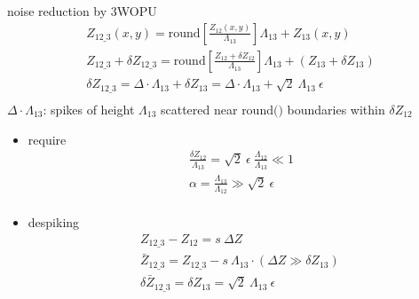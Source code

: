 \documentclass[t, aspectratio=169]{beamer}
\begin{document}
\begin{frame}[allowframebreaks]{noise reduction by 3WOPU}
	\begin{gather*}
Z_{12\_3}(x,y) = \textrm{round}\left[\frac{Z_{12}(x,y)}{\Lambda_{13}}\right] \Lambda_{13} + Z_{13}(x,y) \\
Z_{12\_3} + \delta Z_{12\_3} = \textrm{round}\left[\frac{Z_{12} + \delta Z_{12}}{\Lambda_{13}} \right] \Lambda_{13} + (Z_{13} + \delta Z_{13}) \\
\delta Z_{12\_3} = \Delta\cdot \Lambda_{13} + \delta Z_{13} = \Delta\cdot\Lambda_{13} + \sqrt{2}\ \Lambda_{13}\ \epsilon \\
	\end{gather*}
$\Delta\cdot\Lambda_{13}$: 		spikes of height $\Lambda_{13}$ scattered near $\textrm{round()}$ boundaries within $\delta Z_{12}$ \\
	\begin{itemize}
		\item require
		\begin{gather*}
\frac{\delta Z_{12}}{\Lambda_{13}} = \sqrt{2}\ \epsilon\ \frac{\Lambda_{12}}{\Lambda_{13}} \ll 1 \\
\alpha = \frac{\Lambda_{13}}{\Lambda_{12}} \gg \sqrt{2}\ \epsilon \\
		\end{gather*}
		\item despiking
		\begin{gather*}
Z_{12\_3} - Z_{12} = s\ \Delta Z \\
\bar{Z}_{12\_3} = Z_{12\_3} - s\ \Lambda_{13}\cdot\left(\Delta Z \gg \delta Z_{13}\right)\  \\
\delta\bar{Z}_{12\_3} = \delta Z_{13} = \sqrt{2}\ \Lambda_{13}\ \epsilon
		\end{gather*}
	\end{itemize}
\end{frame}
\end{document}
